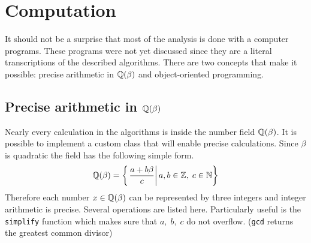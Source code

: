 \documentclass[text.tex]{subfiles}
\begin{document}
\section*{Computation}
It should not be a surprise that most of the analysis is done with a computer programs. These programs were not yet discussed since they are a literal transcriptions of the described algorithms. There are two concepts that make it possible: precise arithmetic in $\mathbb{Q}(\beta)$ and object-oriented programming. 
\subsection{Precise arithmetic in $\mathbb{Q}(\beta)$}
Nearly every calculation in the algorithms is inside the number field $\mathbb{Q}(\beta)$. It is possible to implement a custom class that will enable precise calculations. Since $\beta$ is quadratic the field has the following simple form.
$$\mathbb{Q}(\beta) = \left\{\left. \frac{a + b\beta}{c} \right|a,b\in \mathbb{Z},\; c\in\mathbb{N} \right\}$$
Therefore each number $x\in\mathbb{Q}(\beta)$ can be represented by three integers and integer arithmetic is precise. Several operations are listed here. Particularly useful is the \texttt{simplify} function which makes sure that $a,\;b,\;c$ do not overflow. (\texttt{gcd} returns the greatest common divisor)
\end{document}
